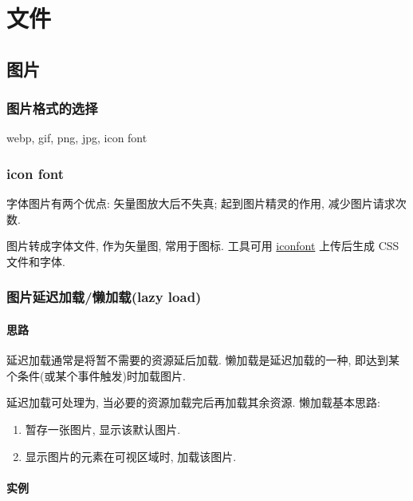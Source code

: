 \section{文件}\label{ux6587ux4ef6}

\subsection{图片}\label{ux56feux7247}

\subsubsection{图片格式的选择}\label{ux56feux7247ux683cux5f0fux7684ux9009ux62e9}

webp, gif, png, jpg, icon font

\subsubsection{icon font}\label{icon-font}

字体图片有两个优点: 矢量图放大后不失真; 起到图片精灵的作用,
减少图片请求次数.

图片转成字体文件, 作为矢量图, 常用于图标. 工具可用
\href{http://www.iconfont.cn/}{iconfont} 上传后生成 CSS 文件和字体.

\subsubsection{图片延迟加载/懒加载(lazy
load)}\label{ux56feux7247ux5ef6ux8fdfux52a0ux8f7dux61d2ux52a0ux8f7dlazy-load}

\paragraph{思路}\label{ux601dux8def}

延迟加载通常是将暂不需要的资源延后加载. 懒加载是延迟加载的一种,
即达到某个条件(或某个事件触发)时加载图片.

延迟加载可处理为, 当必要的资源加载完后再加载其余资源. 懒加载基本思路:

\begin{enumerate}
\def\labelenumi{\arabic{enumi}.}
\tightlist
\item
  暂存一张图片, 显示该默认图片.
\item
  显示图片的元素在可视区域时, 加载该图片.
\end{enumerate}

\paragraph{实例}\label{ux5b9eux4f8b}

